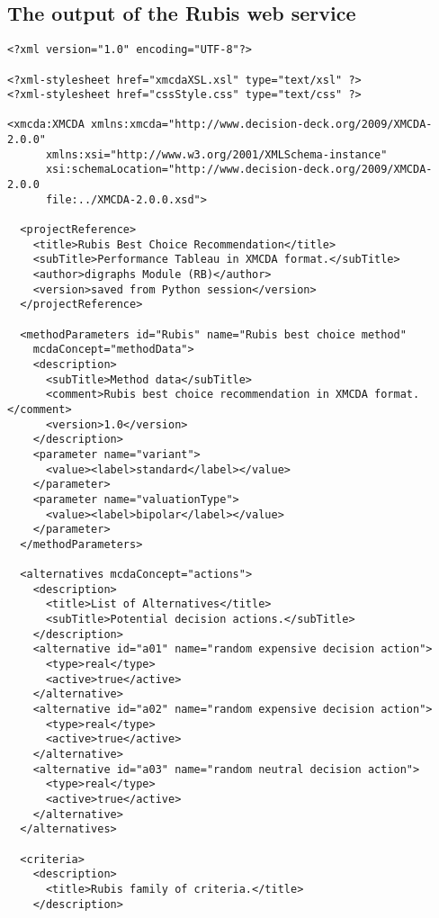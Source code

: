 \documentclass[a4paper,oneside,10 pt]{article}
\newcommand{\code}{\asciifamily}
\begin{document}
\subsection{The output of the Rubis web service}
\begin{multicols}{2}
{\code
\begin{lstlisting}[style=prototype, basicstyle=\tiny]
<?xml version="1.0" encoding="UTF-8"?>

<?xml-stylesheet href="xmcdaXSL.xsl" type="text/xsl" ?>
<?xml-stylesheet href="cssStyle.css" type="text/css" ?>

<xmcda:XMCDA xmlns:xmcda="http://www.decision-deck.org/2009/XMCDA-2.0.0"
      xmlns:xsi="http://www.w3.org/2001/XMLSchema-instance"
      xsi:schemaLocation="http://www.decision-deck.org/2009/XMCDA-2.0.0
      file:../XMCDA-2.0.0.xsd">

  <projectReference>
    <title>Rubis Best Choice Recommendation</title>
    <subTitle>Performance Tableau in XMCDA format.</subTitle>
    <author>digraphs Module (RB)</author>
    <version>saved from Python session</version>
  </projectReference>
    
  <methodParameters id="Rubis" name="Rubis best choice method" 
  	mcdaConcept="methodData">
    <description>
      <subTitle>Method data</subTitle>
      <comment>Rubis best choice recommendation in XMCDA format.</comment>
      <version>1.0</version>
    </description>
    <parameter name="variant">
      <value><label>standard</label></value>
    </parameter>
    <parameter name="valuationType">
      <value><label>bipolar</label></value>
    </parameter>
  </methodParameters>
    
  <alternatives mcdaConcept="actions">
    <description>
      <title>List of Alternatives</title>
      <subTitle>Potential decision actions.</subTitle>
    </description> 
    <alternative id="a01" name="random expensive decision action">
      <type>real</type>
      <active>true</active>
    </alternative>
    <alternative id="a02" name="random expensive decision action">
      <type>real</type>
      <active>true</active>
    </alternative>
    <alternative id="a03" name="random neutral decision action">
      <type>real</type>
      <active>true</active>
    </alternative>
  </alternatives>
    
  <criteria>
    <description>
      <title>Rubis family of criteria.</title>
    </description>
    

\end{lstlisting}}
\end{multicols}
\end{document}
